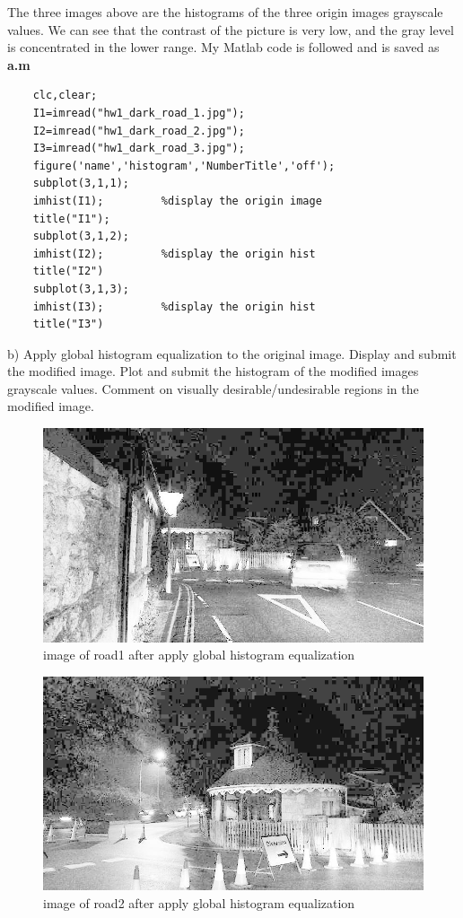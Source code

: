 \documentclass[
	12pt, %
]{fphw}
\begin{document}
The three images above are the histograms of the three origin images grayscale values. We can see that the contrast of the picture is very low, and the gray level is concentrated in the lower range.
My Matlab code is followed and is saved as \textbf{a.m}
\begin{lstlisting}
	clc,clear;
	I1=imread("hw1_dark_road_1.jpg");
	I2=imread("hw1_dark_road_2.jpg");
	I3=imread("hw1_dark_road_3.jpg");
	figure('name','histogram','NumberTitle','off');
	subplot(3,1,1);
	imhist(I1);         %display the origin image
	title("I1");        
	subplot(3,1,2);
	imhist(I2);         %display the origin hist
	title("I2")
	subplot(3,1,3);
	imhist(I3);         %display the origin hist
	title("I3")
\end{lstlisting}

\begin{problem}
	b)  Apply global histogram equalization to the original image. Display and submit the modified image. Plot
	and submit the histogram of the modified images grayscale values. Comment on visually desirable/undesirable
	regions in the modified image.
\end{problem}
\begin{figure}[H]
 
	\centering
	\includegraphics[width=1\columnwidth]{T2/result/I1_global.jpg} 
	\caption{image of road1 after apply global histogram equalization}
	\label{fig10}
\end{figure}
\begin{figure}[H]
 
	\centering
	\includegraphics[width=1\columnwidth]{T2/result/I2_global.jpg} 
	\caption{image of road2 after apply global histogram equalization}
	\label{fig11}
\end{figure}
\end{document}
